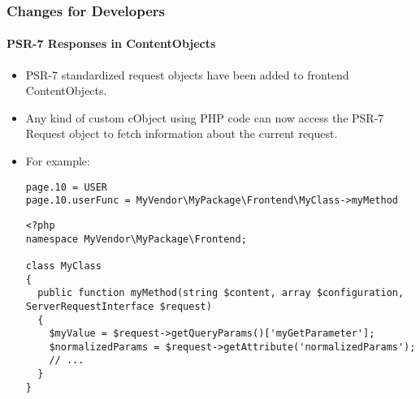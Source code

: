 %

\begin{frame}[fragile]
	\frametitle{Changes for Developers}
	\framesubtitle{PSR-7 Responses in ContentObjects}

	\lstset{basicstyle=\tiny\ttfamily}

	\begin{itemize}
		\item PSR-7 standardized request objects have been added to frontend ContentObjects.
		\item Any kind of custom cObject using PHP code can now access the PSR-7
			Request object to fetch information about the current request.

		\item For example:
\begin{lstlisting}
page.10 = USER
page.10.userFunc = MyVendor\MyPackage\Frontend\MyClass->myMethod
\end{lstlisting}
\begin{lstlisting}
<?php
namespace MyVendor\MyPackage\Frontend;

class MyClass
{
  public function myMethod(string $content, array $configuration, ServerRequestInterface $request)
  {
    $myValue = $request->getQueryParams()['myGetParameter'];
    $normalizedParams = $request->getAttribute('normalizedParams');
	// ...
  }
}
\end{lstlisting}

	\end{itemize}
\end{frame}

